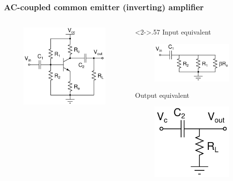 \documentclass[beamer]{standalone}
\begin{document}
\frame
{ \frametitle{AC-coupled common emitter (inverting) amplifier }
\begin{columns}[c]
	\begin{column}{.43\textwidth}
		\begin{figure}
			\includegraphics[height=0.50\textheight]{./schematics/npn_ac_common_emitter_amplifier}
		\end{figure}
	\end{column}
	\begin{column}<2->{.57\textwidth}
		\pause
		Input equivalent
		\begin{figure}
			\includegraphics[height=0.20\textheight]{./schematics/ac_coupled_input}
		\end{figure}

		\pause
		Output equivalent
		\begin{figure}
			\includegraphics[height=0.20\textheight]{./schematics/ac_coupled_output_inv_amplifier}
		\end{figure}


\end{column}
\end{columns}}
\end{document}
